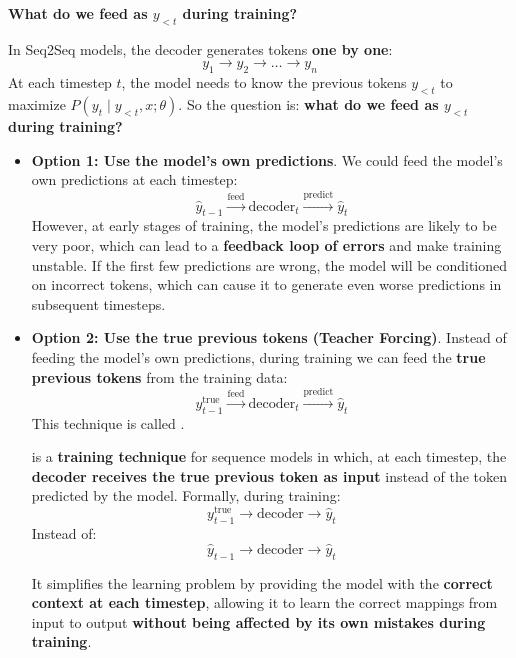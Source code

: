 \highspace
\begin{flushleft}
    \textcolor{Green3}{ \textbf{What do we feed as $y_{<t}$ during training?}}
\end{flushleft}
In Seq2Seq models, the decoder generates tokens \textbf{one by one}:
\begin{equation*}
    y_1 \rightarrow y_2 \rightarrow \dots \rightarrow y_n
\end{equation*}
At each timestep $t$, the model needs to know the previous tokens $y_{<t}$ to maximize $P\left(y_t \mid y_{<t}, x; \theta\right)$. So the question is: \textbf{what do we feed as $y_{<t}$ during training?}
\begin{itemize}
    \item[\textcolor{Red2}{\faIcon{times}}] \textbf{Option 1: Use the model's own predictions}. We could feed the model's own predictions at each timestep:
    \begin{equation*}
        \hat{y}_{t-1} \xrightarrow{\text{feed}} \text{decoder}_{t} \xrightarrow{\text{predict}} \hat{y}_t
    \end{equation*}
    However, at early stages of training, the model's predictions are likely to be very poor, which can lead to a \textbf{feedback loop of errors} and make training unstable. If the first few predictions are wrong, the model will be conditioned on incorrect tokens, which can cause it to generate even worse predictions in subsequent timesteps.


    \item[\textcolor{Green3}{\faIcon{check}}] \textbf{Option 2: Use the true previous tokens (Teacher Forcing)}. Instead of feeding the model's own predictions, during training we can feed the \textbf{true previous tokens} from the training data:
    \begin{equation*}
        y_{t-1}^{\text{true}} \xrightarrow{\text{feed}} \text{decoder}_{t} \xrightarrow{\text{predict}} \hat{y}_t
    \end{equation*}
    This technique is called .
    \begin{definitionbox}
         is a \textbf{training technique} for sequence models in which, at each timestep, the \textbf{decoder receives the true previous token as input} instead of the token predicted by the model. Formally, during training:
        \begin{equation*}
            y_{t-1}^{\text{true}} \rightarrow \text{decoder} \rightarrow \hat{y}_t
        \end{equation*}
        Instead of:
        \begin{equation*}
            \hat{y}_{t-1} \rightarrow \text{decoder} \rightarrow \hat{y}_t
        \end{equation*}
    \end{definitionbox}
    It simplifies the learning problem by providing the model with the \textbf{correct context at each timestep}, allowing it to learn the correct mappings from input to output \textbf{without being affected by its own mistakes during training}.
\end{itemize}

